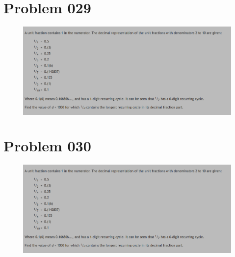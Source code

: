\section{Problem 029}
\begin{prob}
	\begin{figure}[htb!]
		\begin{center}
			\includegraphics[scale = 0.4]{pic/026.png}
		\end{center}
	\end{figure}
\end{prob}

\section{Problem 030}
\begin{prob}
	\begin{figure}[htb!]
		\begin{center}
			\includegraphics[scale = 0.4]{pic/026.png}
		\end{center}
	\end{figure}
\end{prob}

